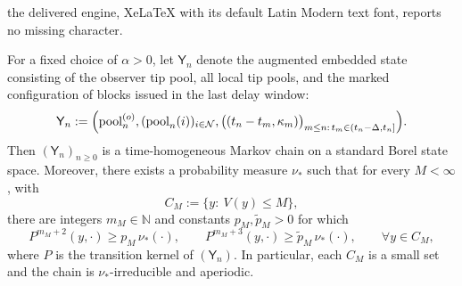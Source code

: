 \documentclass[10pt,a4paper]{amsart}
\newcommand{\Nodes}{{\mathcal N}}
\newcommand{\N}{{\mathbb N}}
\newcommand{\pool}{\mathrm{pool}}
\begin{document}
the delivered engine, XeLaTeX with its default Latin Modern text font, reports no missing character.
\begin{prop}\label{prop:small-set-poisson}
For a fixed choice of $\alpha>0$, let $\mathsf{Y}_n$ denote the augmented embedded state consisting of the observer tip pool, all local tip pools, and the marked configuration of blocks issued in the last delay window:
\[
   \mathsf{Y}_n
   :=
   \Bigl(
      \pool_n^{(o)},
      (\pool_n(i))_{i\in\Nodes},
      \bigl((t_n-t_m,\kappa_m)\bigr)_{m\le n:\, t_m\in(t_n-\Delta,t_n]}
   \Bigr).
\]
Then $(\mathsf{Y}_n)_{n\ge0}$ is a time-homogeneous Markov chain on a standard Borel state space. Moreover, there exists a probability measure $\nu_\ast$ such that for every $M<\infty$, with
\[
   C_M:=\{y:\ V(y)\le M\},
\]
there are integers $m_M\in\N$ and constants $p_M,\widetilde p_M>0$ for which
\[
   P^{m_M+2}(y,\cdot)\ge p_M\,\nu_\ast(\cdot),
   \qquad
   P^{m_M+3}(y,\cdot)\ge \widetilde p_M\,\nu_\ast(\cdot),
   \qquad \forall y\in C_M,
\]
where $P$ is the transition kernel of $(\mathsf{Y}_n)$. In particular, each $C_M$ is a small set and the chain is $\nu_\ast$-irreducible and aperiodic.
\end{prop}
\end{document}
